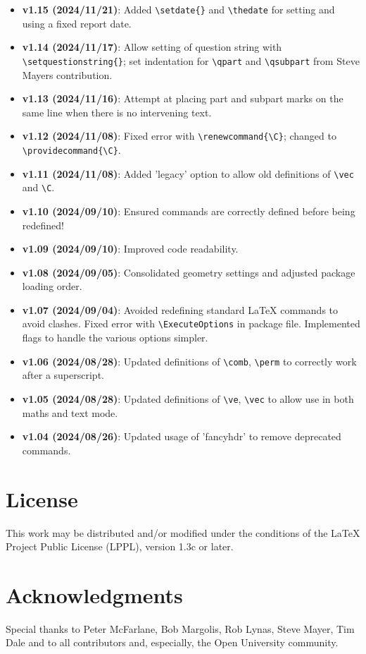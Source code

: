 \documentclass[a4paper,11pt,twoside]{article}
\begin{document}
\begin{itemize}
\item \textbf{v1.15 (2024/11/21)}: Added \verb|\setdate{}| and \verb|\thedate| for setting and using a fixed report date.
\item \textbf{v1.14 (2024/11/17)}: Allow setting of question string with \verb|\setquestionstring{}|; set indentation for \verb|\qpart| and \verb|\qsubpart| from Steve Mayers contribution.
\item \textbf{v1.13 (2024/11/16)}: Attempt at placing part and subpart marks on the same line when there is no intervening text.
\item \textbf{v1.12 (2024/11/08)}: Fixed error with \verb|\renewcommand{\C}|; changed to \\ \verb|\providecommand{\C}|.
\item \textbf{v1.11 (2024/11/08)}: Added 'legacy' option to allow old definitions of \verb|\vec| and \verb|\C|.
\item \textbf{v1.10 (2024/09/10)}: Ensured commands are correctly defined before being redefined!
\item \textbf{v1.09 (2024/09/10)}: Improved code readability.
\item \textbf{v1.08 (2024/09/05)}: Consolidated geometry settings and adjusted package loading order.
\item \textbf{v1.07 (2024/09/04)}: Avoided redefining standard LaTeX commands to avoid clashes. Fixed error with \verb|\ExecuteOptions| in package file. Implemented flags to handle the various options simpler.
\item \textbf{v1.06 (2024/08/28)}: Updated definitions of \verb|\comb|, \verb|\perm| to correctly work after a superscript.
\item \textbf{v1.05 (2024/08/28)}: Updated definitions of \verb|\ve|, \verb|\vec| to allow use in both maths and text mode.
\item \textbf{v1.04 (2024/08/26)}: Updated usage of 'fancyhdr' to remove deprecated commands.
\end{itemize}

\section{License}

This work may be distributed and/or modified under the conditions of the LaTeX Project Public License (LPPL), version 1.3c or later.

\section{Acknowledgments}

Special thanks to Peter McFarlane, Bob Margolis, Rob Lynas, Steve Mayer, Tim Dale and to all contributors and, especially, the Open University community.
\end{document}

